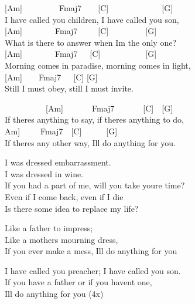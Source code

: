 \documentclass[
  letterpaper,
  a5paper]{memoir}
\begin{document}
{[}Am{]}~~~~~~~~~Fmaj7~~~~{[}C{]}~~~~~~~~~~~~~{[}G{]}\\
I have called you children, I have called you son,\\
{[}Am{]}~~~~~~~~Fmaj7~~~~~{[}C{]}~~~~~~~~~{[}G{]}\\
What is there to answer when I\textquotesingle m the only one?\\
{[}Am{]}~~~~~~~~Fmaj7~~~{[}C{]}~~~~~~~~~~~{[}G{]}\\
Morning comes in paradise, morning comes in light,\\
{[}Am{]}~~~~Fmaj7~~~{[}C{]} {[}G{]}\\
Still I must obey, still I must invite.

~~~~~~~~~~{[}Am{]}~~~~~~~Fmaj7~~~~~~~{[}C{]}~~{[}G{]}\\
If there\textquotesingle s anything to say, if there\textquotesingle s
anything to do,\\
\hspace*{0.333em}\hspace*{0.333em}\hspace*{0.333em}\hspace*{0.333em}\hspace*{0.333em}\hspace*{0.333em}\hspace*{0.333em}\hspace*{0.333em}\hspace*{0.333em}\hspace*{0.333em}{[}Am{]}~~~~~Fmaj7~~{[}C{]}~~~~~~{[}G{]}\\
If there\textquotesingle s any other way, I\textquotesingle ll do
anything for you.

I was dressed embarrassment.\\
I was dressed in wine.\\
If you had a part of me, will you take you\textquotesingle re time?\\
Even if I come back, even if I die\\
Is there some idea to replace my life?

Like a father to impress;\\
Like a mother\textquotesingle s mourning dress,\\
If you ever make a mess, I\textquotesingle ll do anything for you

I have called you preacher; I have called you son.\\
If you have a father or if you haven\textquotesingle t one,\\
I\textquotesingle ll do anything for you (4x)
\end{document}
